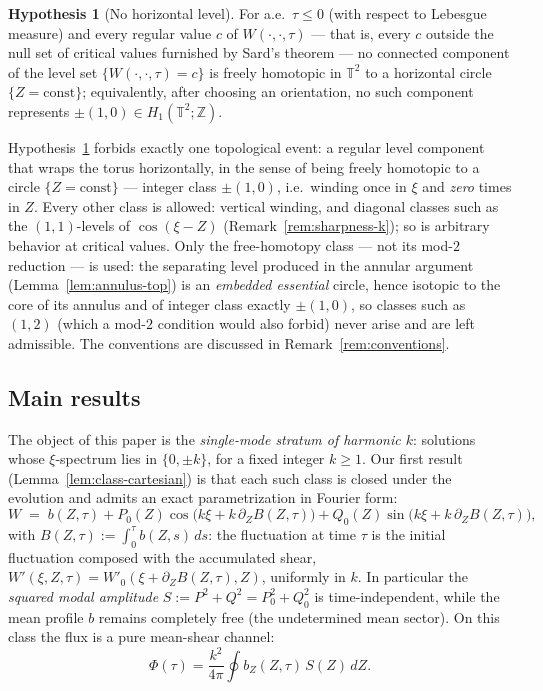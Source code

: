 \documentclass[11pt]{amsart}
\theoremstyle{definition}
\newtheorem{hypothesis}[theorem]{Hypothesis}
\theoremstyle{remark}
\newcommand{\T}{\mathbb{T}}
\begin{document}
\begin{hypothesis}[No horizontal level]\label{hyp:conf}
For a.e.\ $\tau\le0$ (with respect to Lebesgue measure) and every regular
value $c$ of $W(\cdot,\cdot,\tau)$ --- that is, every $c$ outside the
null set of critical values furnished by Sard's theorem --- no connected
component of the level set $\{W(\cdot,\cdot,\tau)=c\}$ is freely homotopic
in $\T^2$ to a horizontal circle $\{Z=\mathrm{const}\}$; equivalently,
after choosing an orientation, no such component represents
$\pm(1,0)\in H_1(\T^2;\mathbb Z)$.
\end{hypothesis}

Hypothesis~\ref{hyp:conf} forbids exactly one topological event: a
regular level component that wraps the torus horizontally, in the sense
of being freely homotopic to a circle $\{Z=\mathrm{const}\}$ --- integer
class $\pm(1,0)$, i.e.\ winding once in $\xi$ and \emph{zero} times in
$Z$. Every other class is allowed: vertical winding, and diagonal classes
such as the $(1,1)$-levels of $\cos(\xi-Z)$
(Remark~\ref{rem:sharpness-k}); so is arbitrary behavior at critical
values. Only the free-homotopy class --- not its mod-$2$ reduction --- is
used: the separating level produced in the annular argument
(Lemma~\ref{lem:annulus-top}) is an \emph{embedded essential} circle,
hence isotopic to the core of its annulus and of integer class exactly
$\pm(1,0)$, so classes such as $(1,2)$ (which a mod-$2$ condition would
also forbid) never arise and are left admissible. The conventions are
discussed in Remark~\ref{rem:conventions}.

\subsection*{Main results}

The object of this paper is the \emph{single-mode stratum of harmonic
$k$}: solutions whose $\xi$-spectrum lies in $\{0,\pm k\}$, for a fixed
integer $k\ge1$. Our first result (Lemma~\ref{lem:class-cartesian}) is
that each such class is closed under the evolution and admits an exact
parametrization in Fourier form:
\[
  W \;=\; b(Z,\tau)
  +P_0(Z)\cos\bigl(k\xi+k\,\partial_ZB(Z,\tau)\bigr)
  +Q_0(Z)\sin\bigl(k\xi+k\,\partial_ZB(Z,\tau)\bigr),
\]
with $B(Z,\tau):=\int_0^\tau b(Z,s)\,ds$: the fluctuation at time $\tau$
is the initial fluctuation composed with the accumulated shear,
$W'(\xi,Z,\tau)=W'_0(\xi+\partial_ZB(Z,\tau),Z)$, uniformly in $k$. In
particular the \emph{squared modal amplitude} $S:=P^2+Q^2=P_0^2+Q_0^2$ is
time-independent, while the mean profile $b$ remains completely free (the
undetermined mean sector). On this class the flux is a pure mean-shear
channel:
\[
  \Phi(\tau)=\frac{k^2}{4\pi}\oint b_Z(Z,\tau)\,S(Z)\,dZ .
\]
\end{document}
